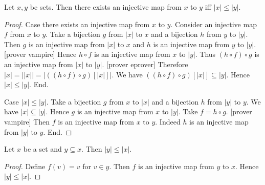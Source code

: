 \documentclass[10pt]{article}
\begin{document}
  \begin{forthel}
    \begin{proposition}
      Let $x, y$ be sets.
      Then there exists an injective map from $x$ to $y$ iff $|x| \leq |y|$.
    \end{proposition}
    \begin{proof}
      Case there exists an injective map from $x$ to $y$.
        Consider an injective map $f$ from $x$ to $y$.
        Take a bijection $g$ from $|x|$ to $x$ and a bijection $h$ from $y$ to
        $|y|$.
        Then $g$ is an injective map from $|x|$ to $x$ and $h$ is an injective
        map from $y$ to $|y|$.
        [prover vampire]
        Hence $h \circ f$ is an injective map from $x$ to $|y|$.
        Thus $(h \circ f) \circ g$ is an injective map from $|x|$ to $|y|$.
        [prover eprover]
        Therefore $|x|
          = ||x||
          = |((h \circ f) \circ g)[|x|]|$.
        We have $((h \circ f) \circ g)[|x|] \subseteq |y|$.
        Hence $|x| \leq |y|$.
      End.

      Case $|x| \leq |y|$.
        Take a bijection $g$ from $x$ to $|x|$ and a bijection $h$ from $|y|$ to
        $y$.
        We have $|x| \subseteq |y|$.
        Hence $g$ is an injective map from $x$ to $|y|$.
        Take $f = h \circ g$.
        [prover vampire]
        Then $f$ is an injective map from $x$ to $y$.
        Indeed $h$ is an injective map from $|y|$ to $y$.
      End.
    \end{proof}
  \end{forthel}

  \begin{forthel}
    \begin{corollary}
      Let $x$ be a set and $y \subseteq x$.
      Then $|y| \leq |x|$.
    \end{corollary}
    \begin{proof}
      Define $f(v) = v$ for $v \in y$.
      Then $f$ is an injective map from $y$ to $x$.
      Hence $|y| \leq |x|$.
    \end{proof}
  \end{forthel}
\end{document}

